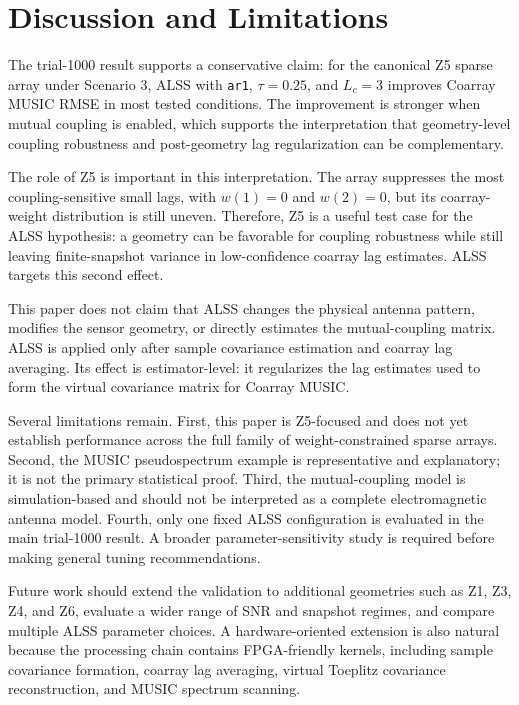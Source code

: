\documentclass[conference]{IEEEtran}
\begin{document}
\section{Discussion and Limitations}

The trial-1000 result supports a conservative claim: for the canonical Z5 sparse array under Scenario 3, ALSS with \texttt{ar1}, $\tau=0.25$, and $L_c=3$ improves Coarray MUSIC RMSE in most tested conditions. The improvement is stronger when mutual coupling is enabled, which supports the interpretation that geometry-level coupling robustness and post-geometry lag regularization can be complementary.

The role of Z5 is important in this interpretation. The array suppresses the most coupling-sensitive small lags, with $w(1)=0$ and $w(2)=0$, but its coarray-weight distribution is still uneven. Therefore, Z5 is a useful test case for the ALSS hypothesis: a geometry can be favorable for coupling robustness while still leaving finite-snapshot variance in low-confidence coarray lag estimates. ALSS targets this second effect.

This paper does not claim that ALSS changes the physical antenna pattern, modifies the sensor geometry, or directly estimates the mutual-coupling matrix. ALSS is applied only after sample covariance estimation and coarray lag averaging. Its effect is estimator-level: it regularizes the lag estimates used to form the virtual covariance matrix for Coarray MUSIC.

Several limitations remain. First, this paper is Z5-focused and does not yet establish performance across the full family of weight-constrained sparse arrays. Second, the MUSIC pseudospectrum example is representative and explanatory; it is not the primary statistical proof. Third, the mutual-coupling model is simulation-based and should not be interpreted as a complete electromagnetic antenna model. Fourth, only one fixed ALSS configuration is evaluated in the main trial-1000 result. A broader parameter-sensitivity study is required before making general tuning recommendations.

Future work should extend the validation to additional geometries such as Z1, Z3, Z4, and Z6, evaluate a wider range of SNR and snapshot regimes, and compare multiple ALSS parameter choices. A hardware-oriented extension is also natural because the processing chain contains FPGA-friendly kernels, including sample covariance formation, coarray lag averaging, virtual Toeplitz covariance reconstruction, and MUSIC spectrum scanning.
\end{document}
